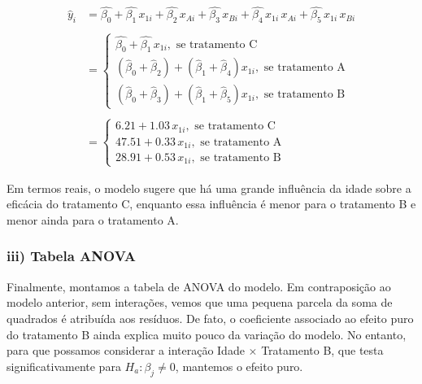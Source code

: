 \documentclass[
  letterpaper,
  DIV=11,
  numbers=noendperiod]{scrartcl}
\begin{document}
\begin{align}
   \hat{y}_i &= \hat{\beta_0} + \hat{\beta_1} \, x_{1i} + \hat{\beta_2} \, x_{Ai} + \hat{\beta_3} \, x_{Bi} + \hat{\beta_4} \, x_{1i} \, x_{Ai} +\hat{\beta_5} \, x_{1i} \, x_{Bi} \nonumber \\
   \nonumber \\
   &= \begin{cases}
        \hat{\beta_0} + \hat{\beta_1} \, x_{1i}, \text{ se tratamento C} \\
        (\hat{\beta}_0 + \hat{\beta}_2) + (\hat{\beta}_1 + \hat{\beta}_4) x_{1i},  \text{ se tratamento A} \\
        (\hat{\beta}_0 + \hat{\beta}_3) + (\hat{\beta}_1 + \hat{\beta}_5) x_{1i},  \text{ se tratamento B}
      \end{cases} \nonumber \\
      \nonumber \\
  &= \begin{cases}
        6.21 + 1.03 \, x_{1i}, \text{ se tratamento C} \\
        47.51 + 0.33 \,  x_{1i},  \text{ se tratamento A} \\
        28.91 + 0.53 \,  x_{1i},  \text{ se tratamento B}
  \end{cases}\label{modelo_decomposto}
\end{align}

Em termos reais, o modelo sugere que há uma grande influência da idade
sobre a eficácia do tratamento C, enquanto essa influência é menor para
o tratamento B e menor ainda para o tratamento A.

\hypertarget{iii-tabela-anova}{%
\subsubsection{iii) Tabela ANOVA}\label{iii-tabela-anova}}

Finalmente, montamos a tabela de ANOVA do modelo. Em contraposição ao
modelo anterior, sem interações, vemos que uma pequena parcela da soma
de quadrados é atribuída aos resíduos. De fato, o coeficiente associado
ao efeito puro do tratamento B ainda explica muito pouco da variação do
modelo. No entanto, para que possamos considerar a interação Idade
\(\times\) Tratamento B, que testa significativamente para
\(H_a: \beta_j \neq 0\), mantemos o efeito puro.
\end{document}
